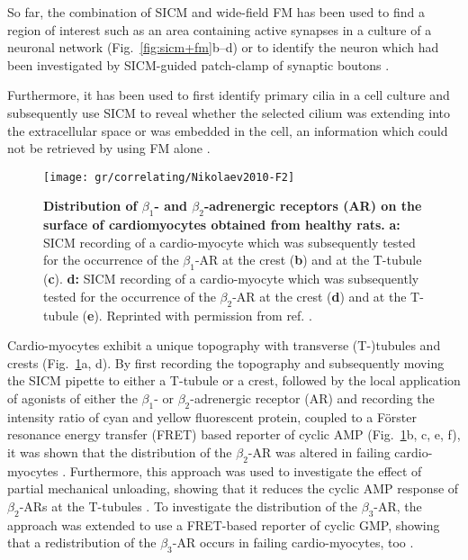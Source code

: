 So far, the combination of SICM and wide-field FM has been used to find a
region of interest such as an area containing active synapses in a culture of
a neuronal network \cite{Scheenen2015} (Fig.~\ref{fig:sicm+fm}b--d) or to
identify the neuron which had been investigated by SICM-guided patch-clamp of
synaptic boutons \cite{Novak2013}.

Furthermore, it has been used to first identify primary cilia in a cell
culture and subsequently use SICM to reveal whether the selected cilium was
extending into the extracellular space or was embedded in the cell, an
information which could not be retrieved by using FM alone \cite{Zhou2018}.


\begin{figure}
  \texttt{[image: gr/correlating/Nikolaev2010-F2]}
  \caption{
    \textbf{Distribution of $\beta_1$- and $\beta_2$-adrenergic receptors (AR) on the surface of 
    cardiomyocytes obtained from healthy rats.}
    \textbf{a:} SICM recording of a cardio-myocyte which was subsequently
    tested for the occurrence of the $\beta_1$-AR at the crest (\textbf{b})
    and at the T-tubule (\textbf{c}). 
    \textbf{d:} SICM recording of a cardio-myocyte which was subsequently
    tested for the occurrence of the $\beta_2$-AR at the crest (\textbf{d})
    and at the T-tubule (\textbf{e}).
    Reprinted with permission from ref. \cite{Nikolaev2010}.
  }
  \label{fig:nikolaev2010}
\end{figure}

Cardio-myocytes exhibit a unique topography with transverse (T-)tubules and
crests (Fig.~\ref{fig:nikolaev2010}a, d). By first recording the topography
and subsequently moving the SICM pipette to either a T-tubule or a crest,
followed by the local application of agonists of either the $\beta_1$- or
$\beta_2$-adrenergic receptor (AR) and recording the intensity ratio of cyan
and yellow fluorescent protein, coupled to a Förster resonance energy transfer
(FRET) based reporter of cyclic AMP (Fig.~\ref{fig:nikolaev2010}b, c, e, f), it was
shown that the distribution of the $\beta_2$-AR was altered in failing
cardio-myocytes \cite{Nikolaev2010}. Furthermore, this approach was used to
investigate the effect of partial mechanical unloading, showing that it
reduces the cyclic AMP response of $\beta_2$-ARs at the T-tubules
\cite{Wright2018}. To investigate the distribution of the $\beta_3$-AR, the
approach was extended to use a FRET-based reporter of cyclic GMP, showing that
a redistribution of the $\beta_3$-AR occurs in failing cardio-myocytes, too
\cite{Schobesberger2020}.



